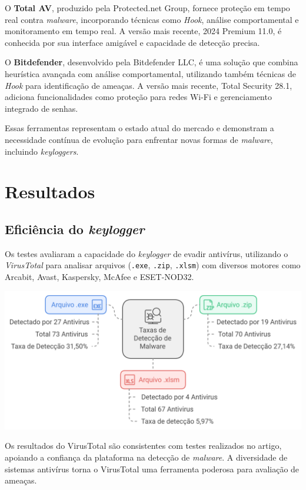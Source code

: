 \documentclass[12pt]{article}
\begin{document}
O \textbf{Total AV}, produzido pela Protected.net Group, fornece proteção em tempo real contra \textit{malware}, incorporando técnicas como \textit{Hook}, análise comportamental e monitoramento em tempo real. A versão mais recente, 2024 Premium 11.0, é conhecida por sua interface amigável e capacidade de detecção precisa.

O \textbf{Bitdefender}, desenvolvido pela Bitdefender LLC, é uma solução que combina heurística avançada com análise comportamental, utilizando também técnicas de \textit{Hook} para identificação de ameaças. A versão mais recente, Total Security 28.1, adiciona funcionalidades como proteção para redes Wi-Fi e gerenciamento integrado de senhas.

Essas ferramentas representam o estado atual do mercado e demonstram a necessidade contínua de evolução para enfrentar novas formas de \textit{malware}, incluindo \textit{keyloggers}.


\section{Resultados}

\subsection{Eficiência do \textit{keylogger}}
Os testes avaliaram a capacidade do \textit{keylogger} de evadir antivírus, utilizando o \textit{VirusTotal} para analisar arquivos (\texttt{.exe}, \texttt{.zip}, \texttt{.xlsm}) com diversos motores como Arcabit, Avast, Kaspersky, McAfee e ESET-NOD32.
\begin{center}
    \includegraphics[width=1\textwidth]{imgs/ViruzTotal.png} %
\end{center}
Os resultados do VirusTotal são consistentes com testes realizados no artigo, apoiando a confiança da plataforma na detecção de \textit{malware}. A diversidade de sistemas antivírus torna o VirusTotal uma ferramenta poderosa para avaliação de ameaças.
\end{document}
